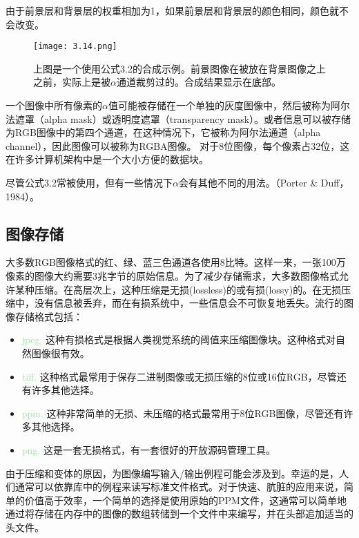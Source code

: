 \documentclass[lang=cn,12pt]{elegantbook}
\begin{document}
\begin{note}
  由于前景层和背景层的权重相加为1，如果前景层和背景层的颜色相同，颜色就不会改变。
\end{note}

\begin{figure}[htb]
  \centering
  \texttt{[image: 3.14.png]}
  \caption{上图是一个使用公式3.2的合成示例。前景图像在被放在背景图像之上之前，实际上是被$\alpha $通道裁剪过的。合成结果显示在底部。}
\end{figure}

一个图像中所有像素的$\alpha $值可能被存储在一个单独的灰度图像中，然后被称为阿尔法遮罩（alpha mask）或透明度遮罩（transparency mask）。或者信息可以被存储为RGB图像中的第四个通道，在这种情况下，它被称为阿尔法通道（alpha channel），因此图像可以被称为RGBA图像。
对于8位图像，每个像素占32位，这在许多计算机架构中是一个大小方便的数据块。

尽管公式3.2常被使用，但有一些情况下$\alpha $会有其他不同的用法。（Porter \& Duff，1984）。

\subsection{图像存储}

大多数RGB图像格式的红、绿、蓝三色通道各使用8比特。这样一来，一张100万像素的图像大约需要3兆字节的原始信息。为了减少存储需求，大多数图像格式允许某种压缩。在高层次上，这种压缩是无损(lossless)的或有损(lossy)的。在无损压缩中，没有信息被丢弃，而在有损系统中，一些信息会不可恢复地丢失。流行的图像存储格式包括：

\begin{itemize}
  \item \textcolor{lightgreen}{jpeg.} 这种有损格式是根据人类视觉系统的阈值来压缩图像块。这种格式对自然图像很有效。
  \item \textcolor{lightgreen}{tiff.} 这种格式最常用于保存二进制图像或无损压缩的8位或16位RGB，尽管还有许多其他选择。
  \item \textcolor{lightgreen}{ppm.} 这种非常简单的无损、未压缩的格式最常用于8位RGB图像，尽管还有许多其他选择。
  \item \textcolor{lightgreen}{png.} 这是一套无损格式，有一套很好的开放源码管理工具。
\end{itemize}

由于压缩和变体的原因，为图像编写输入/输出例程可能会涉及到。幸运的是，人们通常可以依靠库中的例程来读写标准文件格式。对于快速、肮脏的应用来说，简单的价值高于效率，一个简单的选择是使用原始的PPM文件，这通常可以简单地通过将存储在内存中的图像的数组转储到一个文件中来编写，并在头部追加适当的头文件。
\end{document}
